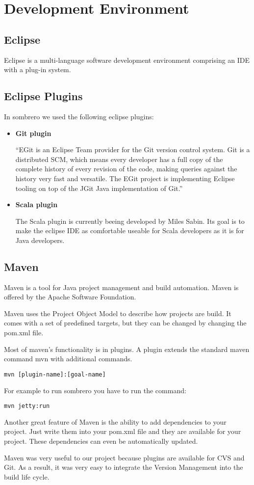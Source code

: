 \section{Development Environment}
\subsection{Eclipse}
    Eclipse is a multi-language software development environment comprising an IDE with a plug-in system.
    
\subsection{Eclipse Plugins}
    In sombrero we used the following eclipse plugins:
    \begin{itemize}
        \item \textbf{Git plugin}


            ``EGit is an Eclipse Team provider for the Git version control system. Git is a distributed SCM, which means every developer has a full copy of the complete history of every revision of the code, making queries against the history very fast and versatile. The EGit project is implementing Eclipse tooling on top of the JGit Java implementation of Git.''\cite{eclipse.org:egit}
        \item \textbf{Scala plugin}


            The Scala plugin is currently beeing developed by Miles Sabin. Its goal is to make the eclipse IDE as comfortable useable for Scala developers as it is for Java developers.
    \end{itemize}
\subsection{Maven}
    Maven is a tool for Java project management and build automation. Maven is offered by the Apache Software Foundation.

    Maven uses the Project Object Model to describe how projects are build. It comes with a set of predefined targets, but they can be changed by changing the pom.xml file.

    Most of maven's functionality is in plugins. A plugin extends the standard maven command mvn with additional commands.

        \lstinline!mvn [plugin-name]:[goal-name]!

    For example to run sombrero you have to run the command:

        \lstinline!mvn jetty:run!

    Another great feature of Maven is the ability to add dependencies to your project. Just write them into your pom.xml file and they are available for your project. These dependencies can even be automatically updated.

    Maven was very useful to our project because plugins are available for CVS and Git. As a result, it was very easy to integrate the Version Management into the build life cycle.
